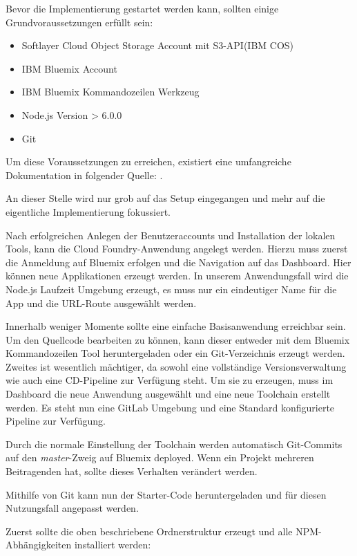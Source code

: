 Bevor die Implementierung gestartet werden kann, sollten einige Grundvoraussetzungen erfüllt sein:

\begin{itemize}
	\item Softlayer Cloud Object Storage Account mit S3-API(IBM COS)
	\item IBM Bluemix Account
	\item IBM Bluemix Kommandozeilen Werkzeug
	\item Node.js Version > 6.0.0
	\item \gls{Git}
\end{itemize}

Um diese Voraussetzungen zu erreichen, existiert eine umfangreiche Dokumentation in folgender Quelle: \cite[S. 129]{Rios.2017}.

An dieser Stelle wird nur grob auf das Setup eingegangen und mehr auf die eigentliche Implementierung fokussiert.

Nach erfolgreichen Anlegen der Benutzeraccounts und Installation der lokalen Tools, kann die Cloud Foundry-Anwendung angelegt werden. Hierzu muss zuerst die Anmeldung auf Bluemix erfolgen und die Navigation auf das Dashboard. Hier können neue Applikationen erzeugt werden. In unserem Anwendungsfall wird die Node.js Laufzeit Umgebung erzeugt, es muss nur ein eindeutiger Name für die App und die URL-Route ausgewählt werden.

Innerhalb weniger Momente sollte eine einfache Basisanwendung erreichbar sein. Um den Quellcode bearbeiten zu können, kann dieser entweder mit dem Bluemix Kommandozeilen Tool heruntergeladen oder ein Git-Verzeichnis erzeugt werden. Zweites ist wesentlich mächtiger, da sowohl eine vollständige Versionsverwaltung wie auch eine \ac{CD}-Pipeline zur Verfügung steht. Um sie zu erzeugen, muss im Dashboard die neue Anwendung ausgewählt und eine neue Toolchain erstellt werden. Es steht nun eine GitLab Umgebung und eine Standard konfigurierte Pipeline zur Verfügung.

Durch die normale Einstellung der Toolchain werden automatisch Git-Commits auf den \textit{master}-Zweig auf Bluemix deployed. Wenn ein Projekt mehreren Beitragenden hat, sollte dieses Verhalten verändert werden.

Mithilfe von \gls{Git} kann nun der Starter-Code heruntergeladen und für diesen Nutzungsfall angepasst werden.

Zuerst sollte die oben beschriebene Ordnerstruktur erzeugt und alle NPM-Abhängigkeiten installiert werden:


